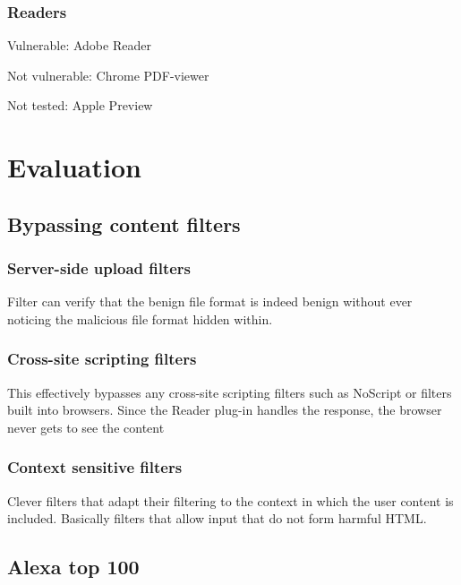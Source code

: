 \documentclass[10pt, conference, compsocconf]{IEEEtran}
\begin{document}
\subsubsection{Readers}

Vulnerable: Adobe Reader

Not vulnerable: Chrome PDF-viewer

Not tested: Apple Preview









\section{Evaluation}


\subsection{Bypassing content filters}


\subsubsection{Server-side upload filters}

Filter can verify that the benign file format is indeed benign 
without ever noticing the malicious file format hidden within.


\subsubsection{Cross-site scripting filters}

This effectively bypasses any cross-site scripting filters such as 
NoScript or filters built into browsers. Since the Reader plug-in 
handles the response, the browser never gets to see the content


\subsubsection{Context sensitive filters}

Clever filters that adapt their filtering to the context in which 
the user content is included. Basically filters that allow input 
that do not form harmful HTML. 


\subsection{Alexa top 100}
\end{document}
